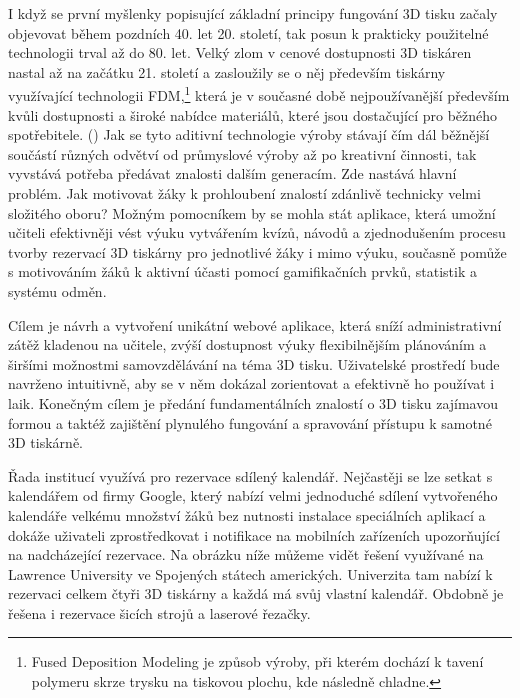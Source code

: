 \documentclass[twoside, 12pt]{article}
\begin{document}



\obsah



I když se první myšlenky popisující základní principy fungování 3D tisku začaly objevovat během pozdních 40. let 20. století, tak posun k prakticky použitelné technologii trval až do 80. let. Velký zlom v cenové dostupnosti 3D tiskáren nastal až na začátku 21. století a zasloužily se o něj především tiskárny využívající technologii FDM,\footnote{Fused Deposition Modeling je způsob výroby, při kterém dochází k tavení polymeru skrze trysku na tiskovou plochu, kde následně chladne.} která je v současné době nejpoužívanější především kvůli dostupnosti a široké nabídce materiálů, které jsou dostačující pro běžného spotřebitele. (\cite{FDMmarketShare}) Jak se tyto aditivní technologie výroby stávají čím dál běžnější součástí různých odvětví od průmyslové výroby až po kreativní činnosti, tak vyvstává potřeba předávat znalosti dalším generacím. Zde nastává hlavní problém. Jak motivovat žáky k prohloubení znalostí zdánlivě technicky velmi složitého oboru? Možným pomocníkem by se mohla stát aplikace, která umožní učiteli efektivněji vést výuku vytvářením kvízů, návodů a zjednodušením procesu tvorby rezervací 3D tiskárny pro jednotlivé žáky i mimo výuku, současně pomůže s motivováním žáků k aktivní účasti pomocí gamifikačních prvků, statistik a systému odměn.


Cílem je návrh a vytvoření unikátní webové aplikace, která sníží administrativní zátěž kladenou na učitele, zvýší dostupnost výuky flexibilnějším plánováním a širšími možnostmi samovzdělávání na téma 3D tisku. Uživatelské prostředí bude navrženo intuitivně, aby se v něm dokázal zorientovat a efektivně ho používat i laik. Konečným cílem je předání fundamentálních znalostí o 3D tisku zajímavou formou a taktéž zajištění plynulého fungování a spravování přístupu k samotné 3D tiskárně.
				



Řada institucí využívá pro rezervace sdílený kalendář. Nejčastěji se lze setkat s kalendářem od firmy Google, který nabízí velmi jednoduché sdílení vytvořeného kalendáře velkému množství žáků bez nutnosti instalace speciálních aplikací a dokáže uživateli zprostředkovat i notifikace na mobilních zařízeních upozorňující na nadcházející rezervace. Na obrázku níže můžeme vidět řešení využívané na Lawrence University ve Spojených státech amerických. Univerzita tam nabízí k rezervaci celkem čtyři 3D tiskárny a každá má svůj vlastní kalendář. Obdobně je řešena i rezervace šicích strojů a laserové řezačky.
\end{document}
